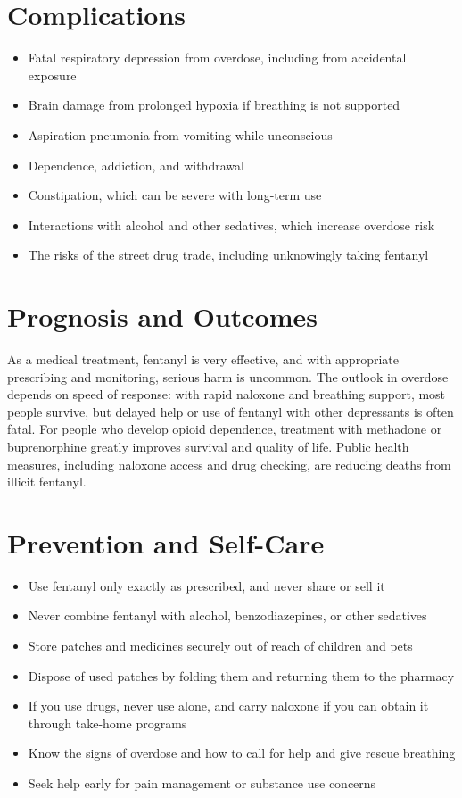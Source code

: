 \section*{Complications}
\begin{itemize}
    \item Fatal respiratory depression from overdose, including from accidental exposure
    \item Brain damage from prolonged hypoxia if breathing is not supported
    \item Aspiration pneumonia from vomiting while unconscious
    \item Dependence, addiction, and withdrawal
    \item Constipation, which can be severe with long-term use
    \item Interactions with alcohol and other sedatives, which increase overdose risk
    \item The risks of the street drug trade, including unknowingly taking fentanyl
\end{itemize}

\section*{Prognosis and Outcomes}
As a medical treatment, fentanyl is very effective, and with appropriate prescribing and monitoring, serious harm is uncommon. The outlook in overdose depends on speed of response: with rapid naloxone and breathing support, most people survive, but delayed help or use of fentanyl with other depressants is often fatal. For people who develop opioid dependence, treatment with methadone or buprenorphine greatly improves survival and quality of life. Public health measures, including naloxone access and drug checking, are reducing deaths from illicit fentanyl.

\section*{Prevention and Self-Care}
\begin{itemize}
    \item Use fentanyl only exactly as prescribed, and never share or sell it
    \item Never combine fentanyl with alcohol, benzodiazepines, or other sedatives
    \item Store patches and medicines securely out of reach of children and pets
    \item Dispose of used patches by folding them and returning them to the pharmacy
    \item If you use drugs, never use alone, and carry naloxone if you can obtain it through take-home programs
    \item Know the signs of overdose and how to call for help and give rescue breathing
    \item Seek help early for pain management or substance use concerns
\end{itemize}

